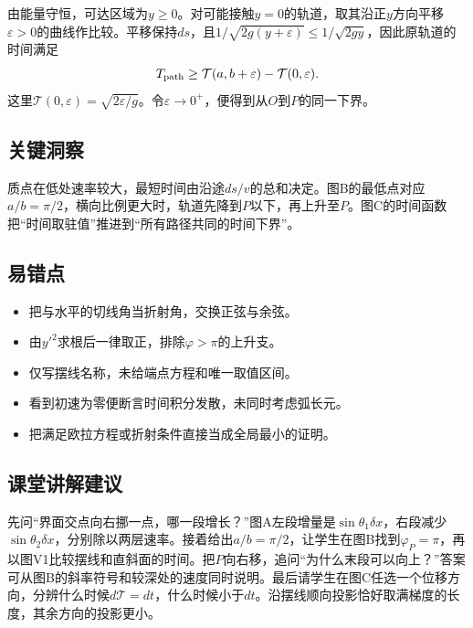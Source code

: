 \documentclass[UTF8,fontset=fandol,a4paper,11pt]{ctexart}
\begin{document}
由能量守恒，可达区域为$y\geq0$。对可能接触$y=0$的轨道，取其沿正$y$方向平移$\varepsilon>0$的曲线作比较。平移保持$ds$，且$1/\sqrt{2g(y+\varepsilon)}\leq1/\sqrt{2gy}$，因此原轨道的时间满足
\[
T_{\rm path}\geq\mathcal T(a,b+\varepsilon)-\mathcal T(0,\varepsilon).
\]
这里$\mathcal T(0,\varepsilon)=\sqrt{2\varepsilon/g}$。令$\varepsilon\to0^+$，便得到从$O$到$P$的同一下界。




\subsection*{关键洞察}

质点在低处速率较大，最短时间由沿途$ds/v$的总和决定。图B的最低点对应$a/b=\pi/2$，横向比例更大时，轨道先降到$P$以下，再上升至$P$。图C的时间函数把“时间取驻值”推进到“所有路径共同的时间下界”。



\subsection*{易错点}

\begin{itemize}
\item 把与水平的切线角当折射角，交换正弦与余弦。
\item 由$y'^2$求根后一律取正，排除$\varphi>\pi$的上升支。
\item 仅写摆线名称，未给端点方程和唯一取值区间。
\item 看到初速为零便断言时间积分发散，未同时考虑弧长元。
\item 把满足欧拉方程或折射条件直接当成全局最小的证明。
\end{itemize}



\subsection*{课堂讲解建议}

先问“界面交点向右挪一点，哪一段增长？”图A左段增量是$\sin\theta_1\delta x$，右段减少$\sin\theta_2\delta x$，分别除以两层速率。接着给出$a/b=\pi/2$，让学生在图B找到$\varphi_P=\pi$，再以图V1比较摆线和直斜面的时间。把$P$向右移，追问“为什么末段可以向上？”答案可从图B的斜率符号和较深处的速度同时说明。最后请学生在图C任选一个位移方向，分辨什么时候$d\mathcal T=dt$，什么时候小于$dt$。沿摆线顺向投影恰好取满梯度的长度，其余方向的投影更小。
\end{document}
